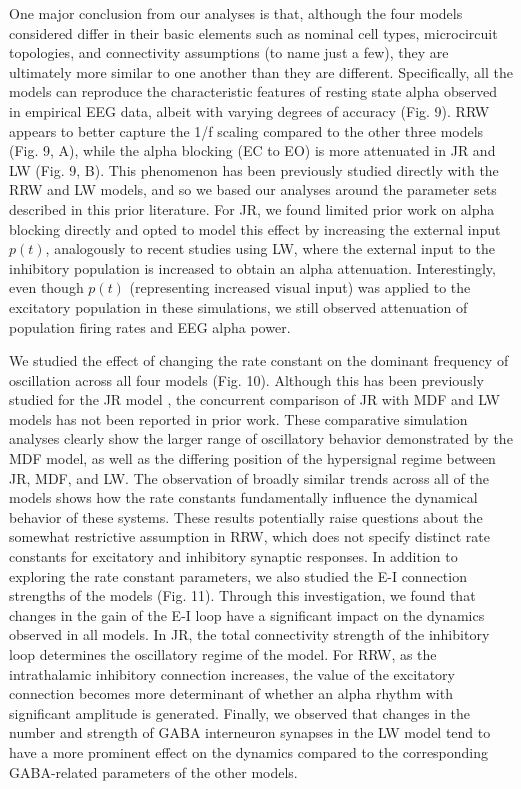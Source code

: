\documentclass[12pt,twoside]{article}
\begin{document}
One major conclusion from our analyses is that, although the four models considered differ in their basic elements such as nominal cell types, microcircuit topologies, and connectivity assumptions (to name just a few), they are ultimately more similar to one another than they are different. Specifically, all the models can reproduce the characteristic features of resting state alpha observed in empirical EEG data, albeit with varying degrees of accuracy (Fig. 9). RRW appears to better capture the 1/f scaling compared to the other three models (Fig. 9, A), while the alpha blocking (EC to EO) is more attenuated in JR and LW (Fig. 9, B). This phenomenon has been previously studied directly with the RRW \citep{robinson2004estimation} and LW \citep{hartoyo2020inferring} models, and so we based our analyses around the parameter sets described in this prior literature. For JR, we found limited prior work on alpha blocking directly and opted to model this effect by increasing the external input $p(t)$, analogously to recent studies using LW, where the external input to the inhibitory population is increased to obtain an alpha attenuation. Interestingly, even though $p(t)$ (representing increased visual input) was applied to the excitatory population in these simulations, we still observed attenuation of population firing rates and EEG alpha power. 

We studied the effect of changing the rate constant on the dominant frequency of oscillation across all four models (Fig. 10). Although this has been previously studied for the JR model \cite{david2003neural, david2006mechanisms, gast2019pyrates}, the concurrent comparison of JR with MDF and LW models has not been reported in prior work. These comparative simulation analyses clearly show the larger range of oscillatory behavior demonstrated by the MDF model, as well as the differing position of the hypersignal regime between JR, MDF, and LW. The observation of broadly similar trends across all of the models shows how the rate constants fundamentally influence the dynamical behavior of these systems. These results potentially raise questions about the somewhat restrictive assumption in RRW, which does not specify distinct rate constants for excitatory and inhibitory synaptic responses. In addition to exploring the rate constant parameters, we also studied the E-I connection strengths of the models (Fig. 11). Through this investigation, we found that changes in the gain of the E-I loop have a significant impact on the dynamics observed in all models. In JR, the total connectivity strength of the inhibitory loop determines the oscillatory regime of the model. For RRW, as the intrathalamic inhibitory connection increases, the value of the excitatory connection becomes more determinant of whether an alpha rhythm with significant amplitude is generated. Finally, we observed that changes in the number and strength of GABA interneuron synapses in the LW model tend to have a more prominent effect on the dynamics compared to the corresponding GABA-related parameters of the other models. 
\end{document}
